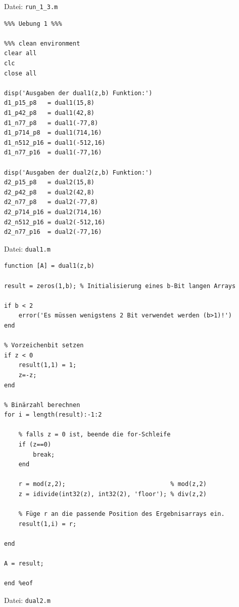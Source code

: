 \documentclass{llncs}
\begin{document}
Datei: \texttt{run\_1\_3.m}
\begin{verbatim}
%%% Uebung 1 %%%

%%% clean environment
clear all
clc
close all

disp('Ausgaben der dual1(z,b) Funktion:')
d1_p15_p8   = dual1(15,8)
d1_p42_p8   = dual1(42,8)
d1_n77_p8   = dual1(-77,8)
d1_p714_p8  = dual1(714,16)
d1_n512_p16 = dual1(-512,16)
d1_n77_p16  = dual1(-77,16)

disp('Ausgaben der dual2(z,b) Funktion:')
d2_p15_p8   = dual2(15,8)
d2_p42_p8   = dual2(42,8)
d2_n77_p8   = dual2(-77,8)
d2_p714_p16 = dual2(714,16)
d2_n512_p16 = dual2(-512,16)
d2_n77_p16  = dual2(-77,16)
\end{verbatim}
Datei: \texttt{dual1.m}
\begin{verbatim}
function [A] = dual1(z,b)

result = zeros(1,b); % Initialisierung eines b-Bit langen Arrays

if b < 2
    error('Es müssen wenigstens 2 Bit verwendet werden (b>1)!')
end

% Vorzeichenbit setzen
if z < 0
    result(1,1) = 1;
    z=-z;
end

% Binärzahl berechnen
for i = length(result):-1:2

    % falls z = 0 ist, beende die for-Schleife
    if (z==0)
        break;
    end
    
    r = mod(z,2);                             % mod(z,2)
    z = idivide(int32(z), int32(2), 'floor'); % div(z,2)
    
    % Füge r an die passende Position des Ergebnisarrays ein.
    result(1,i) = r; 
 
end

A = result;

end %eof
\end{verbatim}
Datei: \texttt{dual2.m}
\end{document}
